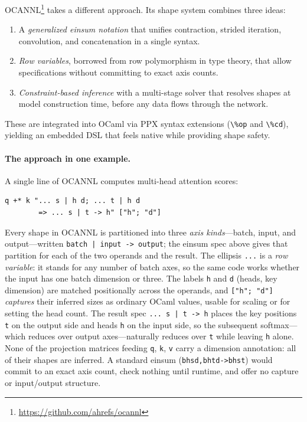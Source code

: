 \documentclass[acmsmall,nonacm,review]{acmart}
\newcommand{\code}[1]{\lstinline[basicstyle=\normalsize\ttfamily]{#1}}
\newcommand{\spec}[1]{\texttt{\small #1}}
\begin{document}
OCANNL\footnote{\url{https://github.com/ahrefs/ocannl}} takes a different
approach. Its shape system combines three ideas:
\begin{enumerate}
\item A \emph{generalized einsum notation} that unifies contraction, strided
  iteration, convolution, and concatenation in a single syntax.
\item \emph{Row variables}, borrowed from row polymorphism in type theory,
  that allow specifications without committing to exact axis counts.
\item \emph{Constraint-based inference} with a multi-stage solver that
  resolves shapes at model construction time, before any data flows through
  the network.
\end{enumerate}
These are integrated into OCaml via PPX syntax extensions (\code{\%op} and
\code{\%cd}), yielding an embedded DSL that feels native while providing
shape safety.

\paragraph{The approach in one example.}
A single line of OCANNL computes multi-head attention scores:
\begin{lstlisting}
q +* k "... s | h d; ... t | h d
        => ... s | t -> h" ["h"; "d"]
\end{lstlisting}
Every shape in OCANNL is partitioned into three \emph{axis kinds}---batch,
input, and output---written \spec{batch | input -> output}; the einsum spec
above gives that partition for each of the two operands and the result. The
ellipsis \spec{...} is a \emph{row variable}: it stands for any number of
batch axes, so the same code works whether the input has one batch dimension
or three. The labels \spec{h} and \spec{d} (heads, key dimension) are matched
positionally across the operands, and \code{["h"; "d"]} \emph{captures} their
inferred sizes as ordinary OCaml values, usable for scaling or for setting
the head count. The result spec \spec{... s | t -> h} places the key
positions \spec{t} on the output side and heads \spec{h} on the input side,
so the subsequent softmax---which reduces over output axes---naturally
reduces over \spec{t} while leaving \spec{h} alone. None of the projection
matrices feeding \spec{q}, \spec{k}, \spec{v} carry a dimension annotation:
all of their shapes are inferred. A standard einsum (\spec{bhsd,bhtd->bhst})
would commit to an exact axis count, check nothing until runtime, and offer
no capture or input/output structure.
\end{document}
